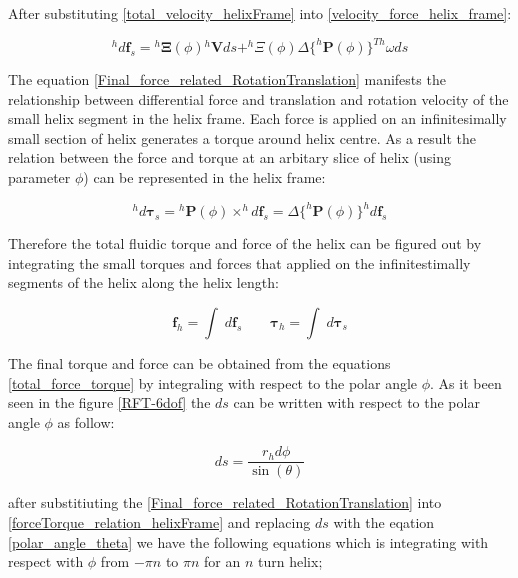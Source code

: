 \documentclass[12pt,a4paper,titlepage]{report}
\begin{document}
After substituting \ref{total_velocity_helixFrame} into \ref{velocity_force_helix_frame}:

\begin{equation}
 ^{h}d\bm{f}_s = {^{h}\bm{\Xi}}(\phi){^{h}\bm{V}}{ds} + ^{h}\Xi(\phi)\Delta{\{^{h}\bm{P}(\phi)}\}^{Th}\omega{ds}
\label{Final_force_related_RotationTranslation}
\end{equation}

The equation \ref{Final_force_related_RotationTranslation} manifests the relationship between differential force
and translation and rotation velocity of the small helix segment in the helix frame. Each force is applied on 
an infinitesimally small section of helix generates a torque around helix centre. As a result the 
relation between the force and torque at an arbitary slice of helix (using parameter $\phi$) can be 
represented in the helix frame:

\begin{equation}
 ^{h}d\bm{\tau}_s = {^{h}\bm{P}(\phi)} \times ^{h}d\bm{f}_s=\Delta{\{^{h}\bm{P}(\phi)}\}^{h}{d\bm{f}_s}
\label{forceTorque_relation_helixFrame}
\end{equation}

Therefore the total fluidic torque and force of the helix can be figured out by integrating the small torques
and forces that applied on the infinitestimally segments of the helix along the helix length:

\begin{equation}
 \bm{f}_h = \int \; d\bm{f}_s  \qquad  \bm{\tau}_h = \int \; d\bm{\tau}_s 
\label{total_force_torque}
\end{equation} 
 
The final torque and force can be obtained from the equations \ref{total_force_torque} by 
integraling with respect to the polar angle $\phi$. As it been seen in the figure \ref{RFT-6dof} the $ds$
can be written with respect to the polar angle $\phi$ as follow:


\begin{equation}
ds = \frac{r_hd\phi}{\sin(\theta)}
\label{polar_angle_theta}
\end{equation} 

after substitiuting the \ref{Final_force_related_RotationTranslation} into \ref{forceTorque_relation_helixFrame} and 
replacing $ds$ with the eqation \ref{polar_angle_theta} we have the following equations which is 
integrating with respect with $\phi$ from $-\pi n$ to $\pi n$ for an $n$ turn helix;
\end{document}
